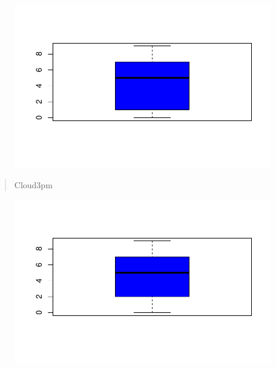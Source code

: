 \documentclass[
  letterpaper,
  DIV=11,
  numbers=noendperiod]{scrartcl}
\newenvironment{Shaded}{\begin{snugshade}}{\end{snugshade}}
\newcommand{\AttributeTok}[1]{\textcolor[rgb]{0.40,0.45,0.13}{#1}}
\newcommand{\FunctionTok}[1]{\textcolor[rgb]{0.28,0.35,0.67}{#1}}
\newcommand{\NormalTok}[1]{\textcolor[rgb]{0.00,0.23,0.31}{#1}}
\newcommand{\SpecialCharTok}[1]{\textcolor[rgb]{0.37,0.37,0.37}{#1}}
\newcommand{\StringTok}[1]{\textcolor[rgb]{0.13,0.47,0.30}{#1}}
\begin{document}
\begin{figure}[H]

{\centering \includegraphics{RainAus_EDA_files/figure-pdf/unnamed-chunk-22-1.pdf}

}

\end{figure}

\begin{quote}
Cloud3pm
\end{quote}

\begin{Shaded}
\end{Shaded}

\begin{figure}[H]

{\centering \includegraphics{RainAus_EDA_files/figure-pdf/unnamed-chunk-23-1.pdf}

}

\end{figure}
\end{document}
